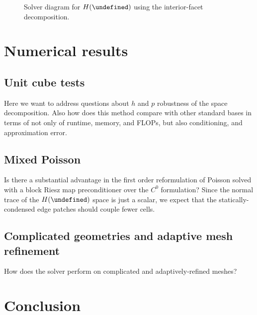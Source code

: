 \documentclass[review,onefignum,onetabnum,a4paper]{siamart190516}
\let\grad\undefined
\let\div\undefined
\DeclareMathOperator{\grad}{grad}
\DeclareMathOperator{\div}{div}
\newcommand{\Hgrad}{H(\grad)}
\newcommand{\Hdiv}{H(\div)}
\begin{document}
\begin{figure}
\footnotesize
\centering
{}
\caption{Solver diagram for $\Hgrad$ using the interior-facet decomposition.}
\end{figure}


\section{Numerical results} \label{sec:results}

\subsection{Unit cube tests}
Here we want to address questions about $h$ and $p$ robustness of the space
decomposition. Also how does this method compare with other standard bases in
terms of not only of runtime, memory, and FLOPs, but also conditioning, and
approximation error.

\subsection{Mixed Poisson}
Is there a substantial advantage in the first order reformulation of Poisson solved
with a block Riesz map preconditioner over the $C^0$ formulation?
Since the normal trace of the $\Hdiv$ space is just a scalar, we expect that the
statically-condensed edge patches should couple fewer cells.


\subsection{Complicated geometries and adaptive mesh refinement}
How does the solver perform on complicated and adaptively-refined meshes?


\section{Conclusion} \label{sec:conclusion}





\end{document}
